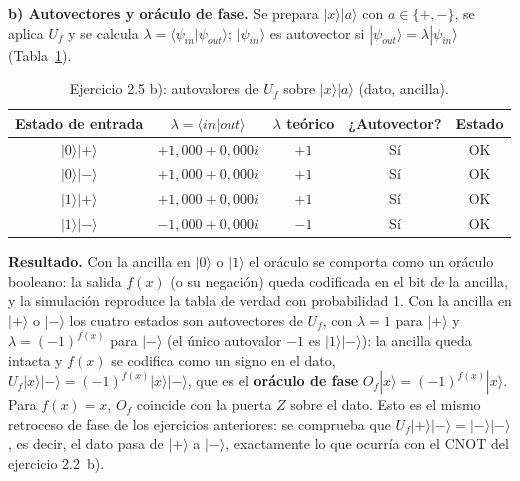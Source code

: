 \textbf{b) Autovectores y oráculo de fase.} Se prepara $|x\rangle|a\rangle$ con $a\in\{+,-\}$, se aplica $U_f$ y se calcula $\lambda=\langle\psi_{in}|\psi_{out}\rangle$; $|\psi_{in}\rangle$ es autovector si $|\psi_{out}\rangle=\lambda|\psi_{in}\rangle$ (Tabla~\ref{tab:bloque2_e2_5b}).

\begin{table}[htbp]
    \centering
    \begin{tabular}{c|c|c|c|c}
    \hline
    Estado de entrada & $\lambda=\langle in|out\rangle$ & $\lambda$ teórico & ¿Autovector? & Estado \\
    \hline
    $|0\rangle|{+}\rangle$ & $+1{,}000+0{,}000i$ & $+1$ & Sí & OK \\
    $|0\rangle|{-}\rangle$ & $+1{,}000+0{,}000i$ & $+1$ & Sí & OK \\
    $|1\rangle|{+}\rangle$ & $+1{,}000+0{,}000i$ & $+1$ & Sí & OK \\
    $|1\rangle|{-}\rangle$ & $-1{,}000+0{,}000i$ & $-1$ & Sí & OK \\
    \hline
    \end{tabular}
    \caption{Ejercicio 2.5 b): autovalores de $U_f$ sobre $|x\rangle|a\rangle$ (dato, ancilla).}\label{tab:bloque2_e2_5b}
\end{table}


\textbf{Resultado.} Con la ancilla en $|0\rangle$ o $|1\rangle$ el oráculo se comporta como un oráculo booleano: la salida $f(x)$ (o su negación) queda codificada en el bit de la ancilla, y la simulación reproduce la tabla de verdad con probabilidad 1. Con la ancilla en $|{+}\rangle$ o $|{-}\rangle$ los cuatro estados son autovectores de $U_f$, con $\lambda=1$ para $|{+}\rangle$ y $\lambda=(-1)^{f(x)}$ para $|{-}\rangle$ (el único autovalor $-1$ es $|1\rangle|{-}\rangle$): la ancilla queda intacta y $f(x)$ se codifica como un signo en el dato, $U_f|x\rangle|{-}\rangle=(-1)^{f(x)}|x\rangle|{-}\rangle$, que es el \textbf{oráculo de fase} $O_f|x\rangle=(-1)^{f(x)}|x\rangle$. Para $f(x)=x$, $O_f$ coincide con la puerta $Z$ sobre el dato. Esto es el mismo retroceso de fase de los ejercicios anteriores: se comprueba que $U_f|{+}\rangle|{-}\rangle=|{-}\rangle|{-}\rangle$, es decir, el dato pasa de $|{+}\rangle$ a $|{-}\rangle$, exactamente lo que ocurría con el CNOT del ejercicio 2.2~b).